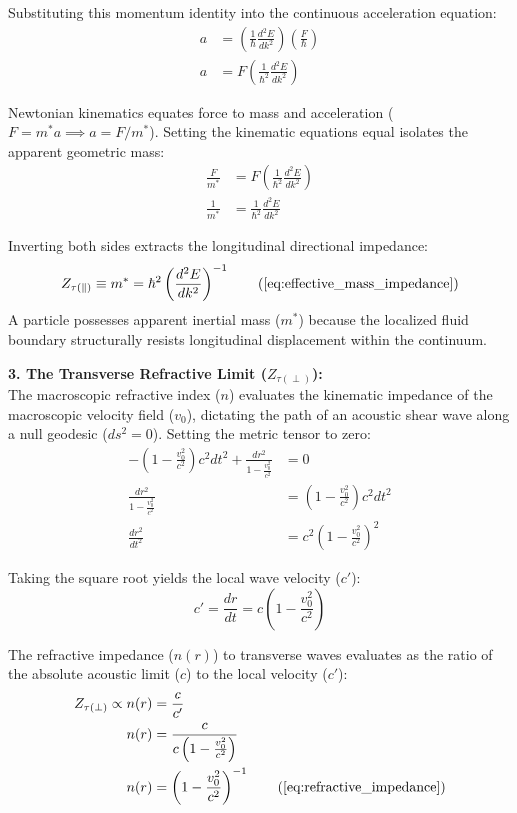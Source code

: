 \documentclass[11pt, a4paper]{article}
\begin{document}
Substituting this momentum identity into the continuous acceleration equation:
\begin{align}
    a &= \left( \frac{1}{\hbar} \frac{d^2 E}{dk^2} \right) \left( \frac{F}{\hbar} \right)  \\
    a &= F \left( \frac{1}{\hbar^2} \frac{d^2 E}{dk^2} \right) 
\end{align}

Newtonian kinematics equates force to mass and acceleration ($F = m^* a \implies a = F/m^*$). Setting the kinematic equations equal isolates the apparent geometric mass:
\begin{align}
    \frac{F}{m^*} &= F \left( \frac{1}{\hbar^2} \frac{d^2 E}{dk^2} \right)  \\
    \frac{1}{m^*} &= \frac{1}{\hbar^2} \frac{d^2 E}{dk^2} 
\end{align}

Inverting both sides extracts the longitudinal directional impedance:
\begin{equation}
    Z_{\tau(\parallel)} \equiv m^* = \hbar^2 \left( \frac{d^2 E}{dk^2} \right)^{-1} \tag{\ref{eq:effective_mass_impedance}}
\end{equation}
A particle possesses apparent inertial mass ($m^*$) because the localized fluid boundary structurally resists longitudinal displacement within the continuum.

\textbf{3. The Transverse Refractive Limit ($Z_{\tau(\perp)}$):} \\
The macroscopic refractive index ($n$) evaluates the kinematic impedance of the macroscopic velocity field ($v_0$), dictating the path of an acoustic shear wave along a null geodesic ($ds^2 = 0$). Setting the metric tensor to zero:
\begin{align}
    -\left(1 - \frac{v_0^2}{c^2}\right)c^2 dt^2 + \frac{dr^2}{1 - \frac{v_0^2}{c^2}} &= 0  \\
    \frac{dr^2}{1 - \frac{v_0^2}{c^2}} &= \left(1 - \frac{v_0^2}{c^2}\right)c^2 dt^2  \\
    \frac{dr^2}{dt^2} &= c^2 \left(1 - \frac{v_0^2}{c^2}\right)^2 
\end{align}

Taking the square root yields the local wave velocity ($c'$):
\begin{equation}
    c' = \frac{dr}{dt} = c \left(1 - \frac{v_0^2}{c^2}\right) 
\end{equation}

The refractive impedance ($n(r)$) to transverse waves evaluates as the ratio of the absolute acoustic limit ($c$) to the local velocity ($c'$):
\begin{align}
    Z_{\tau(\perp)} \propto n(r) &= \frac{c}{c'}  \\
    n(r) &= \frac{c}{c \left(1 - \frac{v_0^2}{c^2}\right)}  \\
    n(r) &= \left(1 - \frac{v_0^2}{c^2}\right)^{-1} \tag{\ref{eq:refractive_impedance}}
\end{align}
\end{document}
